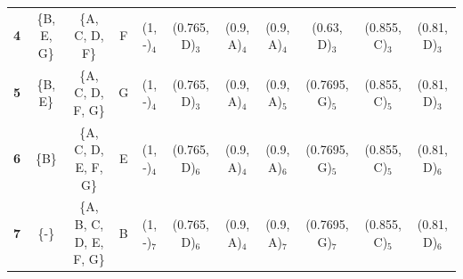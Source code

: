 \begin{homeworkProblem}
\begin{enumerate}[a)]
\begin{table}
{\begin{tabular}{ccccccccccc}
\textbf{4}                           & \{B, E, G\}                               & \{A, C, D, F\}                          & F                                       & (1, -)$_4$        & (0.765, D)$_3$  & (0.9, A)$_4$   & (0.9, A)$_4$   & (0.63, D)$_3$    & (0.855, C)$_3$  & (0.81, D)$_3$  \\
\textbf{5}                           & \{B, E\}                                  & \{A, C, D, F, G\}                       & G                                       & (1, -)$_4$        & (0.765, D)$_3$  & (0.9, A)$_4$   & (0.9, A)$_5$   & (0.7695, G)$_5$  & (0.855, C)$_5$  & (0.81, D)$_3$  \\
\textbf{6}                           & \{B\}                                     & \{A, C, D, E, F, G\}                    & E                                       & (1, -)$_4$        & (0.765, D)$_6$  & (0.9, A)$_4$   & (0.9, A)$_6$   & (0.7695, G)$_5$  & (0.855, C)$_5$  & (0.81, D)$_6$  \\
\textbf{7}                           & \{-\}                                     & \{A, B, C, D, E, F, G\}                 & B                                       & (1, -)$_7$        & (0.765, D)$_6$  & (0.9, A)$_4$   & (0.9, A)$_7$   & (0.7695, G)$_7$  & (0.855, C)$_5$  & (0.81, D)$_6$ 
\end{tabular}
}%
\end{table}
\end{enumerate}
\end{homeworkProblem}

\clearpage


